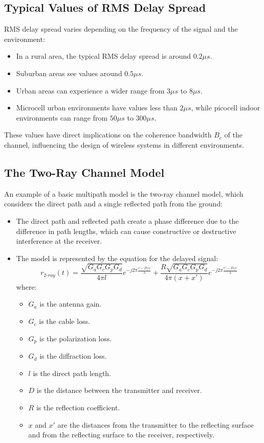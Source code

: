 \subsection*{Typical Values of RMS Delay Spread}

RMS delay spread varies depending on the frequency of the signal and the environment:

\begin{itemize}
    \item In a rural area, the typical RMS delay spread is around \(0.2 \mu s\).
    \item Suburban areas see values around \(0.5 \mu s\).
    \item Urban areas can experience a wider range from \(3 \mu s\) to \(8 \mu s\).
    \item Microcell urban environments have values less than \(2 \mu s\), while picocell indoor environments can range from \(50 \mu s\) to \(300 \mu s\).
\end{itemize}

These values have direct implications on the coherence bandwidth \( B_c \) of the channel, influencing the design of wireless systems in different environments.

\subsection*{The Two-Ray Channel Model}

An example of a basic multipath model is the two-ray channel model, which considers the direct path and a single reflected path from the ground:

\begin{itemize}
    \item The direct path and reflected path create a phase difference due to the difference in path lengths, which can cause constructive or destructive interference at the receiver.
    \item The model is represented by the equation for the delayed signal:
    \[
    r_{2\text{-}ray}(t) = \frac{\sqrt{G_a G_c G_p G_d}}{4\pi l} e^{-j 2\pi \frac{r - D/c}{\lambda}} + \frac{R \sqrt{G_a G_c G_p G_d}}{4\pi (x + x')} e^{-j 2\pi \frac{r' - D/c}{\lambda}}
    \]
    where:
    \begin{itemize}
        \item \( G_a \) is the antenna gain.
        \item \( G_c \) is the cable loss.
        \item \( G_p \) is the polarization loss.
        \item \( G_d \) is the diffraction loss.
        \item \( l \) is the direct path length.
        \item \( D \) is the distance between the transmitter and receiver.
        \item \( R \) is the reflection coefficient.
        \item \( x \) and \( x' \) are the distances from the transmitter to the reflecting surface and from the reflecting surface to the receiver, respectively.
    \end{itemize}
\end{itemize}


